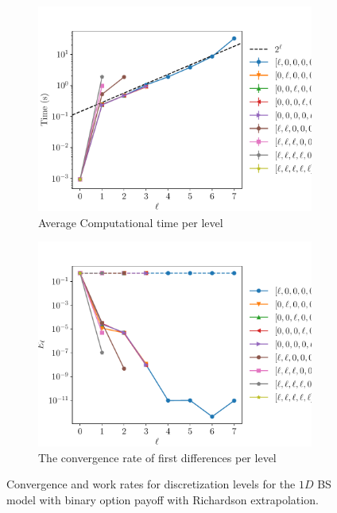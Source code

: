 \documentclass[11pt]{article}
\begin{document}
\begin{figure}[!h]
	\centering
	\begin{subfigure}{.5\textwidth}
		\centering
		\includegraphics[width=0.95\linewidth]{./figures/binary_8_16_steps/level_work.pdf}
		\caption{Average Computational time per level}
		\label{fig:misc_binary_8_16_steps_sub3}
	\end{subfigure}%
	\begin{subfigure}{.5\textwidth}
		\centering
		\includegraphics[width=0.95\linewidth]{./figures/binary_8_16_steps/levels_error_rate.pdf}
		\caption{ The convergence rate of first differences per level}
		\label{fig:misc_binary_8_16_steps_sub4}
	\end{subfigure}%
	\caption{Convergence and work rates for discretization levels for the $1D$ BS model with binary option payoff with Richardson extrapolation.}
	\label{fig:misc_binary_8_16_steps_2}
\end{figure}
\end{document}
